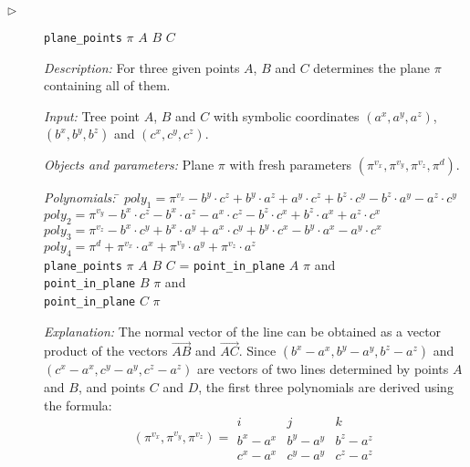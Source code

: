 \documentclass[final,1p,times,authoryear]{elsarticle}
\begin{document}
\begin{description}
\item[$\triangleright$] {\tt plane\_points} $\pi$ $A$ $B$ $C$

{\em Description:} For three given points $A$, $B$ and $C$ determines
the plane $\pi$ containing all of them.

{\em Input:} Tree point $A$, $B$ and $C$ with symbolic coordinates
$(a^x, a^y, a^z)$, $(b^x, b^y, b^z)$ and $(c^x, c^y, c^z)$.

{\em Objects and parameters:} Plane $\pi$ with fresh parameters
$(\pi^{v_x}, \pi^{v_y}, \pi^{v_z}, \pi^{d})$.

\begin{tabbing}
{\em Polynomials:} \= $poly_1 = \pi^{v_x} - b^y\cdot c^z + b^y\cdot a^z + a^y\cdot c^z + b^z\cdot c^y - b^z\cdot a^y - a^z\cdot c^y$ \\
                   \> $poly_2 = \pi^{v_y} - b^x\cdot c^z - b^x\cdot a^z - a^x\cdot c^z - b^z\cdot c^x + b^z\cdot a^x + a^z\cdot c^x$ \\
                   \> $poly_3 = \pi^{v_z} - b^x\cdot c^y + b^x\cdot a^y + a^x\cdot c^y + b^y\cdot c^x - b^y\cdot a^x - a^y\cdot c^x$ \\
                   \> $poly_4 = \pi^{d} + \pi^{v_x}\cdot a^x + \pi^{v_y}\cdot a^y + \pi^{v_z}\cdot a^z$ \\
                   \> {\tt plane\_points} $\pi$ $A$ $B$ $C$ = \= {\tt point\_in\_plane} $A$ $\pi$ and \\
                                                              \>\> {\tt point\_in\_plane} $B$ $\pi$ and \\
                                                              \>\> {\tt point\_in\_plane} $C$ $\pi$ \\
\end{tabbing}

{\em Explanation:} The normal vector of the line can be obtained as a
vector product of the vectors $\overrightarrow{AB}$ and
$\overrightarrow{AC}$. Since $(b^x - a^x, b^y - a^y, b^z - a^z)$ and
$(c^x - a^x, c^y - a^y, c^z - a^z)$ are vectors of two lines
determined by points $A$ and $B$, and points $C$ and $D$, the first
three polynomials are derived using the formula:
$$(\pi^{v_x}, \pi^{v_y}, \pi^{v_z}) = \begin{array}{ccc} i & j & k \\ b^x
  - a^x & b^y - a^y & b^z - a^z \\ c^x - a^x & c^y - a^y & c^z - a^z
\end{array}$$


\end{description}
\end{document}
